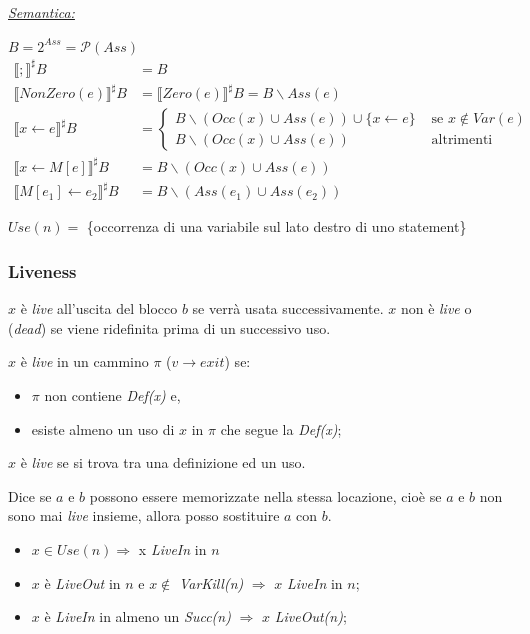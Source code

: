\documentclass[a4paper, 11pt]{report}
\begin{document}
\noindent
\underline{\textit{Semantica:}}

$B = 2^{Ass} = \mathcal{P}(Ass)$
\begin{align*}
\llbracket ; \rrbracket^\sharp B &= B\\
\llbracket NonZero(e) \rrbracket^\sharp B &= \llbracket Zero(e) \rrbracket^\sharp B = B \backslash Ass(e)\\
\llbracket x\leftarrow e \rrbracket^\sharp B &= \begin{cases}
B\backslash (Occ(x) \cup Ass(e)) \cup \{x\leftarrow e \} &\text{ se } x\notin Var(e) \\
B\backslash (Occ(x) \cup Ass(e)) &\text{ altrimenti}
\end{cases}\\
\llbracket x\leftarrow M[e] \rrbracket^\sharp B &= B\backslash (Occ(x) \cup Ass(e))\\
\llbracket M[e_1]\leftarrow e_2 \rrbracket^\sharp B &= B\backslash (Ass(e_1) \cup Ass(e_2))
\end{align*}

$Use(n) = $ \{occorrenza di una variabile sul lato destro di uno statement\}

\newpage
\subsubsection*{Liveness}
$x$ è \textit{live} all'uscita del blocco $b$ se verrà usata successivamente. $x$ non è \textit{live} o (\textit{dead}) se viene ridefinita prima di un successivo uso.

\noindent
$x$ è \textit{live} in un cammino $\pi$ ($v\rightarrow exit$) se:
\begin{itemize}
	\item $\pi$ non contiene \textit{Def(x)} e,
	\item esiste almeno un uso di $x$ in $\pi$ che segue la \textit{Def(x)};
\end{itemize}
\noindent
$x$ è \textit{live} se si trova tra una definizione ed un uso.

\noindent
Dice se $a$ e $b$ possono essere memorizzate nella stessa locazione, cioè se $a$ e $b$ non sono mai \textit{live} insieme, allora posso sostituire $a$ con $b$.

\begin{itemize}
	\item $x\in Use(n) \Rightarrow$ x \textit{LiveIn} in $n$
	\item $x$ è \textit{LiveOut} in $n$ e $x\notin$ \textit{VarKill(n)} $\Rightarrow$ $x$ \textit{LiveIn} in $n$;
	\item $x$ è \textit{LiveIn} in almeno un \textit{Succ(n)} $\Rightarrow$ $x$ \textit{LiveOut(n)};
\end{itemize}
\end{document}
